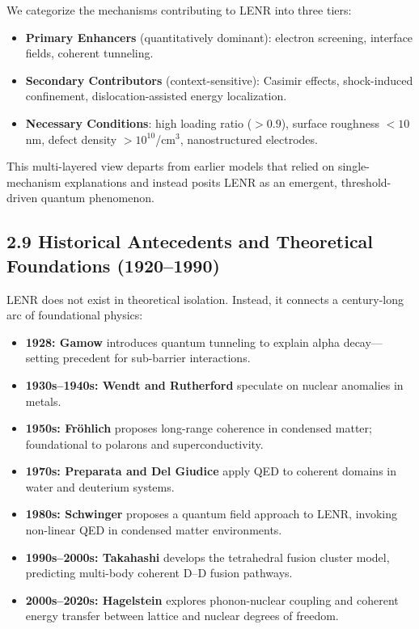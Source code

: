     We categorize the mechanisms contributing to LENR into three tiers:
    
    \begin{itemize}
        \item \textbf{Primary Enhancers} (quantitatively dominant): electron screening, interface fields, coherent tunneling.
        \item \textbf{Secondary Contributors} (context-sensitive): Casimir effects, shock-induced confinement, dislocation-assisted energy localization.
        \item \textbf{Necessary Conditions}: high loading ratio ($>0.9$), surface roughness $<10$ nm, defect density $>10^{10}$/cm$^3$, nanostructured electrodes.
    \end{itemize}
    
    This multi-layered view departs from earlier models that relied on single-mechanism explanations and instead posits LENR as an emergent, threshold-driven quantum phenomenon.
    
    \subsection{2.9 Historical Antecedents and Theoretical Foundations (1920–1990)}
    
    LENR does not exist in theoretical isolation. Instead, it connects a century-long arc of foundational physics:
    
    \begin{itemize}
        \item \textbf{1928: Gamow} introduces quantum tunneling to explain alpha decay—setting precedent for sub-barrier interactions.
        \item \textbf{1930s–1940s: Wendt and Rutherford} speculate on nuclear anomalies in metals.
        \item \textbf{1950s: Fröhlich} proposes long-range coherence in condensed matter; foundational to polarons and superconductivity.
        \item \textbf{1970s: Preparata and Del Giudice} apply QED to coherent domains in water and deuterium systems.
        \item \textbf{1980s: Schwinger} proposes a quantum field approach to LENR, invoking non-linear QED in condensed matter environments.
        \item \textbf{1990s–2000s: Takahashi} develops the tetrahedral fusion cluster model, predicting multi-body coherent D–D fusion pathways.
        \item \textbf{2000s–2020s: Hagelstein} explores phonon-nuclear coupling and coherent energy transfer between lattice and nuclear degrees of freedom.
    \end{itemize}
    

